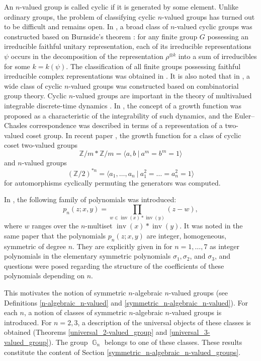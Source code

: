 \documentclass[14pt, dvipsnames]{extarticle}
\theoremstyle{definition}
\theoremstyle{definition}
\theoremstyle{remark}
\DeclareMathOperator{\G}{\mathbb{G}}
\DeclareMathOperator{\inv}{\mathrm{inv}}
\begin{document}
An $n$-valued group is called cyclic if it is generated by some element. Unlike ordinary groups, the problem of classifying cyclic $n$-valued groups has turned out to be difficult and remains open. In \cite{Buchstaber}, a broad class of $n$-valued cyclic groups was constructed based on Burnside’s theorem \cite[Chapter XV, Theorem IV]{Burnside55}: for any finite group $G$ possessing an irreducible faithful unitary representation, each of its irreducible representations $\psi$ occurs in the decomposition of the representation $\rho^{\otimes k}$ into a sum of irreducibles for some $k = k(\psi)$. The classification of all finite groups possessing faithful irreducible complex representations was obtained in \cite{Gaschtz54}. It is also noted that in \cite{BuchVesnin}, a wide class of cyclic $n$-valued groups was constructed based on combinatorial group theory. Cyclic $n$-valued groups are important in the theory of multivalued integrable discrete-time dynamics \cite{Veselov91, Buchstaber_Veselov}. In \cite{Buchstaber_Veselov}, the concept of a growth function was proposed as a characteristic of the integrability of such dynamics, and the Euler–Chasles correspondence was described in terms of a representation of a two-valued coset group. In recent paper \cite{Kornev}, the growth function for a class of cyclic coset two-valued groups
$$\mathbb{Z}/m\ast\mathbb{Z}/m = \langle a, b\ | \ a^m = b^m = 1 \rangle$$
and $n$-valued groups
$$\left (\mathbb{Z}/2\right )^{\ast n}= \langle a_1, \dots, a_n \ | \ a_1^2=\dots=a_n^2=1 \rangle$$
for automorphisms cyclically permuting the generators was computed.

In \cite{BuchRees}, the following family of polynomials was introduced:
$$p_n(z; x,y) = \prod\limits_{w\in \inv(x)\ast \inv(y)} (z - w),$$
where $w$ ranges over the $n$-multiset $\inv(x)\ast \inv(y)$. It was noted in the same paper that the polynomials $p_n(z; x, y)$ are integer, homogeneous, symmetric of degree $n$. They are explicitly given in \cite{Buchstaber} for $n= 1, \dots,7$ as integer polynomials in the elementary symmetric polynomials $\sigma_1, \sigma_2$, and $\sigma_3$, and questions were posed regarding the structure of the coefficients of these polynomials depending on $n$.

This motivates the notion of symmetric $n$-algebraic $n$-valued groups (see Definitions \ref{n-algebraic_n-valued} and \ref{symmetric_n-algebraic_n-valued}). For each $n$, a notion of classes of symmetric $n$-algebraic $n$-valued groups is introduced. For $n = 2, 3$, a description of the universal objects of these classes is obtained (Theorems \ref{universal_2-valued_group} and \ref{universal_3-valued_group}). The group $\G_n$ belongs to one of these classes. These results constitute the content of Section \ref{symmetric_n-algebraic_n-valued_groups}.
\end{document}
